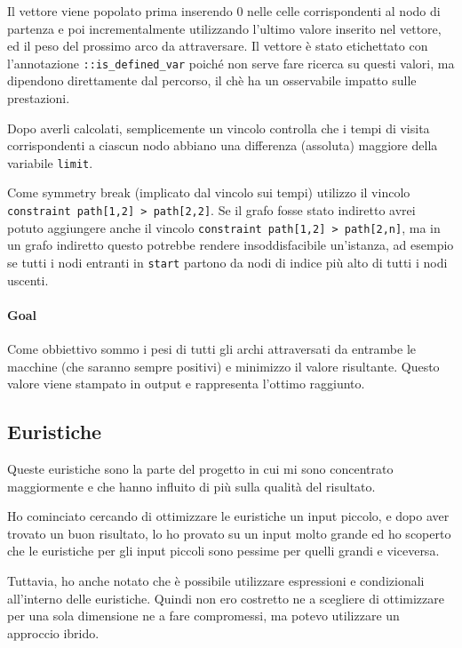 \documentclass[12pt, a4paper]{article}
\begin{document}
Il vettore viene popolato prima inserendo $0$ nelle celle corrispondenti al nodo di partenza e poi incrementalmente utilizzando l'ultimo valore inserito nel vettore, ed il peso del prossimo arco da attraversare. Il vettore è stato etichettato con l'annotazione \lstinline{::is_defined_var} poiché non serve fare ricerca su questi valori, ma dipendono direttamente dal percorso, il chè ha un osservabile impatto sulle prestazioni.

Dopo averli calcolati, semplicemente un vincolo controlla che i tempi di visita corrispondenti a ciascun nodo abbiano una differenza (assoluta) maggiore della variabile \lstinline{limit}.

Come symmetry break (implicato dal vincolo sui tempi) utilizzo il vincolo \lstinline{constraint path[1,2] > path[2,2]}.
Se il grafo fosse stato indiretto avrei potuto aggiungere anche il vincolo \lstinline{constraint path[1,2] > path[2,n]}, ma in un grafo indiretto questo potrebbe rendere insoddisfacibile un'istanza, ad esempio se tutti i nodi entranti in \lstinline{start} partono da nodi di indice più alto di tutti i nodi uscenti.

\paragraph{Goal}
Come obbiettivo sommo i pesi di tutti gli archi attraversati da entrambe le macchine (che saranno sempre positivi) e minimizzo il valore risultante.
Questo valore viene stampato in output e rappresenta l'ottimo raggiunto.

\subsection{Euristiche}

Queste euristiche sono la parte del progetto in cui mi sono concentrato maggiormente e che hanno influito di più sulla qualità del risultato.

Ho cominciato cercando di ottimizzare le euristiche un input piccolo, e dopo aver trovato un buon risultato, lo ho provato su un input molto grande ed ho scoperto che le euristiche per gli input piccoli sono pessime per quelli grandi e viceversa.

Tuttavia, ho anche notato che è possibile utilizzare espressioni e condizionali all'interno delle euristiche. Quindi non ero costretto ne a scegliere di ottimizzare per una sola dimensione ne a fare compromessi, ma potevo utilizzare un approccio ibrido.
\end{document}
